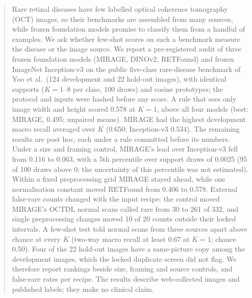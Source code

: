 \documentclass[conference]{IEEEtran}
\begin{document}
\begin{abstract}
Rare retinal diseases have few labelled optical coherence tomography (OCT) images, so their benchmarks are assembled from many sources, while frozen foundation models promise to classify them from a handful of examples. We ask whether few-shot scores on such a benchmark measure the disease or the image source. We report a pre-registered audit of three frozen foundation models (MIRAGE, DINOv2, RETFound) and frozen ImageNet Inception-v3 on the public five-class rare-disease benchmark of Yoo et al.\ (124 development and 22 hold-out images), with identical supports ($K=1$--8 per class, 100 draws) and cosine prototypes; the protocol and inputs were hashed before any score. A rule that sees only image width and height scored 0.578 at $K=1$, above all four models (best: MIRAGE, 0.495; unpaired means). MIRAGE had the highest development macro recall averaged over $K$ (0.650; Inception-v3 0.534). The remaining results are post hoc, each under a rule committed before its numbers. Under a size and framing control, MIRAGE's lead over Inception-v3 fell from 0.116 to 0.063, with a 5th percentile over support draws of 0.0025 (95 of 100 draws above 0; the uncertainty of this percentile was not estimated). Within a fixed preprocessing grid MIRAGE stayed ahead, while one normalisation constant moved RETFound from 0.406 to 0.578. External false-rare counts changed with the input recipe: the control moved MIRAGE's OCTDL normal scans called rare from 30 to 261 of 332, and single preprocessing changes moved 10 of 20 counts outside their locked intervals. A few-shot test told normal scans from three sources apart above chance at every $K$ (two-way macro recall at least 0.67 at $K=1$; chance 0.50). Four of the 22 hold-out images have a same-picture copy among the development images, which the locked duplicate screen did not flag. We therefore report rankings beside size, framing and source controls, and false-rare rates per recipe. The results describe web-collected images and published labels; they make no clinical claim.
\end{abstract}
\end{document}
